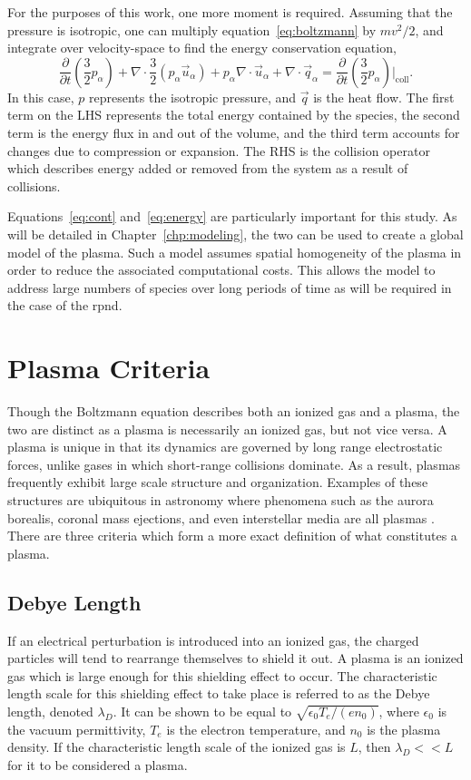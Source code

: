 For the purposes of this work, one more moment is required. Assuming that the
pressure is isotropic, one can multiply equation~\ref{eq:boltzmann} by $mv^2/2$,
and integrate over velocity-space to find the energy conservation equation,
\begin{equation}
  \frac{\partial}{\partial t}\left(\frac{3}{2}p_\alpha\right) 
  + \nabla\cdot\frac{3}{2} (p_\alpha\vec{u}_\alpha)
  + p_\alpha\nabla\cdot\vec{u}_\alpha
  + \nabla\cdot\vec{q}_\alpha
  = \frac{\partial}{\partial
  t}\left(\frac{3}{2}p_\alpha\right)\bigg|_\mathrm{coll}.
  \label{eq:energy}
\end{equation}
In this case, $p$ represents the isotropic pressure, and $\vec{q}$ is the heat
flow. The first term on the LHS represents the total energy contained by the
species, the second term is the energy flux in and out of the volume, and the
third term accounts for changes due to compression or expansion. The RHS is the
collision operator which describes energy added or removed from the system as a
result of collisions.

Equations~\ref{eq:cont} and~\ref{eq:energy} are particularly important for this
study. As will be detailed in Chapter~\ref{chp:modeling}, the two can be used to
create a global model of the plasma. Such a model assumes spatial homogeneity of
the plasma in order to reduce the associated computational costs. This allows
the model to address large numbers of species over long periods of time as will
be required in the case of the \acs{rpnd}.

\section{Plasma Criteria}
Though the Boltzmann equation describes both an ionized gas and a plasma, the
two are distinct as a plasma is necessarily an ionized gas, but not vice versa.
A plasma is unique in that its dynamics are governed by long range electrostatic
forces, unlike gases in which short-range collisions dominate. As a result,
plasmas frequently exhibit large scale structure and organization. Examples of
these structures are ubiquitous in astronomy where phenomena such as the aurora
borealis, coronal mass ejections, and even interstellar media are all plasmas
\cite{Chen1984}. There are three criteria which form a more exact definition of
what constitutes a plasma.

\subsection{Debye Length}
If an electrical perturbation is introduced into an ionized gas, the charged
particles will tend to rearrange themselves to shield it out. A plasma is an
ionized gas which is large enough for this shielding effect to occur. The
characteristic length scale for this shielding effect to take place is referred
to as the Debye length, denoted $\lambda_D$. It can be shown to be equal to
$\sqrt{\epsilon_0T_e/(en_0)}$, where $\epsilon_0$ is the vacuum permittivity,
$T_e$ is the electron temperature, and $n_0$ is the plasma density. If the
characteristic length scale of the ionized gas is $L$, then $\lambda_D << L$ for
it to be considered a plasma.

